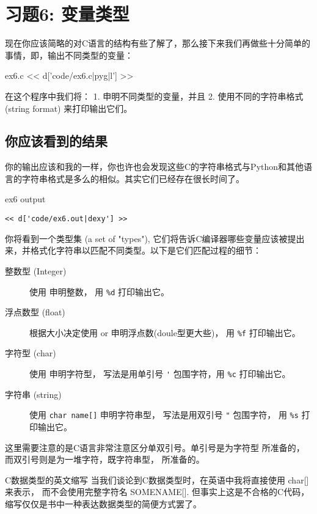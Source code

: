 \chapter{习题6: 变量类型}

现在你应该简略的对C语言的结构有些了解了，那么接下来我们再做些十分简单的事情，即，输出不同类型的变量：

\begin{code}{ex6.c}
<< d['code/ex6.c|pyg|l'] >>
\end{code}

在这个程序中我们将：
1. 申明不同类型的变量，并且
2. 使用不同的字符串格式(string format)  来打印输出它们。


\section{你应该看到的结果}

你的输出应该和我的一样，你也许也会发现这些C的字符串格式与Python和其他语言的字符串格式是多么的相似。其实它们已经存在很长时间了。

\begin{code}{ex6 output}
\begin{lstlisting}
<< d['code/ex6.out|dexy'] >>
\end{lstlisting}
\end{code}

你将看到一个类型集 (a set of "types"), 它们将告诉C编译器哪些变量应该被提出来，并格式化字符串以匹配不同类型。以下是它们匹配过程的细节：

\begin{description}
\item[整数型 (Integer) ] 使用  申明整数， 用 \verb|%d| 打印输出它。
\item[浮点数型 (float)] 根据大小决定使用  or  申明浮点数(doule型更大些)， 用 \verb|%f| 打印输出它。
\item[字符型 (char)] 使用  申明字符型， 写法是用单引号 \verb|'| 包围字符，用 \verb|%c| 打印输出它。
\item[字符串 (string)] 使用 \verb|char name[]| 申明字符串型， 写法是用双引号 \verb|"| 包围字符， 用 \verb|%s| 打印输出它。 
\end{description}

这里需要注意的是C语言非常注意区分单双引号。单引号是为字符型  所准备的，而双引号则是为一堆字符，既字符串型，  所准备的。

\begin{aside}{C数据类型的英文缩写}
当我们谈论到C数据类型时，在英语中我将直接使用 char[] 来表示， 而不会使用完整字符名 SOMENAME[]. 但事实上这是不合格的C代码， 缩写仅仅是书中一种表达数据类型的简便方式罢了。
\end{aside}

